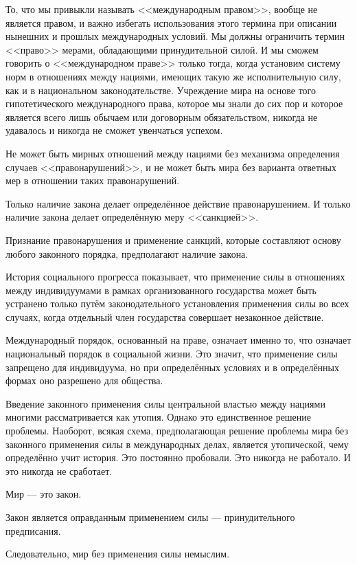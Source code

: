 То, что мы привыкли называть <<международным правом>>, вообще не является правом, и важно избегать использования этого термина при описании нынешних и прошлых международных условий. Мы должны ограничить термин <<право>> мерами, обладающими принудительной силой. И мы сможем говорить о <<международном праве>> только тогда, когда установим систему норм в отношениях между нациями, имеющих такую же исполнительную силу, как и в национальном законодательстве. Учреждение мира на основе того гипотетического международного права, которое мы знали до сих пор и которое является всего лишь обычаем или договорным обязательством, никогда не удавалось и никогда не сможет увенчаться успехом.

Не может быть мирных отношений между нациями без механизма определения случаев <<правонарушений>>, и не может быть мира без варианта ответных мер в отношении таких правонарушений.

Только наличие закона делает определённое действие правонарушением. И только наличие закона делает определённую меру <<санкцией>>.

Признание правонарушения и применение санкций, которые составляют основу любого законного порядка, предполагают наличие закона.

\sloppy История социального прогресса показывает, что применение силы в отношениях между индивидуумами в рамках организованного государства может быть устранено только путём законодательного установления применения силы во всех случаях, когда отдельный член государства совершает незаконное действие.

Международный порядок, основанный на праве, означает именно то, что означает национальный порядок в социальной жизни. Это значит, что применение силы запрещено для индивидуума, но при определённых условиях и в определённых формах оно разрешено для общества.

Введение законного применения силы центральной властью между нациями многими рассматривается как утопия. Однако это единственное решение проблемы. Наоборот, всякая схема, предполагающая решение проблемы мира без законного применения силы в международных делах, является утопической, чему определённо учит история. Это постоянно пробовали. Это никогда не работало. И это никогда не сработает.

Мир — это закон.

Закон является оправданным применением силы — принудительного предписания.

Следовательно, мир без применения силы немыслим.
